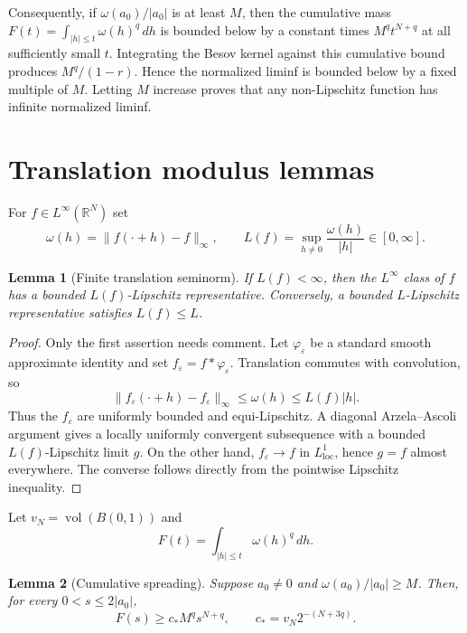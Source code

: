 \documentclass[11pt]{article}
\newtheorem{lemma}{Lemma}
\newcommand{\R}{\mathbb R}
\newcommand{\vol}{\operatorname{vol}}
\begin{document}
Consequently, if $\omega(a_0)/|a_0|$ is at least $M$, then the cumulative
mass $F(t)=\int_{|h|\leq t}\omega(h)^q\,dh$ is bounded below by a constant
times $M^q t^{N+q}$ at all sufficiently small $t$. Integrating the Besov
kernel against this cumulative bound produces
$M^q/(1-r)$. Hence the normalized liminf is bounded below by a fixed
multiple of $M$. Letting $M$ increase proves that any non-Lipschitz function
has infinite normalized liminf.

\section{Translation modulus lemmas}

For $f\in L^\infty(\R^N)$ set
\[
 \omega(h)=\|f(\cdot+h)-f\|_\infty,
 \qquad
 L(f)=\sup_{h\ne0}\frac{\omega(h)}{|h|}\in[0,\infty].
\]

\begin{lemma}[Finite translation seminorm]
If $L(f)<\infty$, then the $L^\infty$ class of $f$ has a bounded
$L(f)$-Lipschitz representative. Conversely, a bounded $L$-Lipschitz
representative satisfies $L(f)\leq L$.
\end{lemma}

\begin{proof}
Only the first assertion needs comment. Let $\varphi_\varepsilon$ be a
standard smooth approximate identity and set
$f_\varepsilon=f*\varphi_\varepsilon$. Translation commutes with convolution,
so
\[
 \|f_\varepsilon(\cdot+h)-f_\varepsilon\|_\infty
 \leq\omega(h)\leq L(f)|h|.
\]
Thus the $f_\varepsilon$ are uniformly bounded and equi-Lipschitz. A diagonal
Arzela--Ascoli argument gives a locally uniformly convergent subsequence with
a bounded $L(f)$-Lipschitz limit $g$. On the other hand,
$f_\varepsilon\to f$ in $L^1_{\mathrm{loc}}$, hence $g=f$ almost everywhere.
The converse follows directly from the pointwise Lipschitz inequality.
\end{proof}

Let $v_N=\vol(B(0,1))$ and
\[
 F(t)=\int_{|h|\leq t}\omega(h)^q\,dh.
\]

\begin{lemma}[Cumulative spreading]
Suppose $a_0\ne0$ and
$\omega(a_0)/|a_0|\geq M$. Then, for every $0<s\leq2|a_0|$,
\begin{equation}
 F(s)\geq c_* M^q s^{N+q},
 \qquad c_*=v_N2^{-(N+3q)}.
 \label{eq:cumulative}
\end{equation}
\end{lemma}
\end{document}
